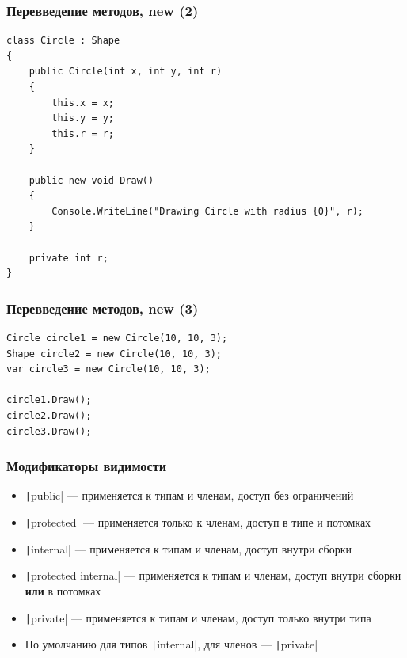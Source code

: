 \documentclass[xetex,mathserif,serif]{beamer}
\begin{document}
	\begin{frame}[fragile]
		\frametitle{Перевведение методов, new (2)}
		\begin{small}
			\begin{verbatim}
class Circle : Shape
{
    public Circle(int x, int y, int r)
    {
        this.x = x;
        this.y = y;
        this.r = r;
    }

    public new void Draw()
    {
        Console.WriteLine("Drawing Circle with radius {0}", r);
    }

    private int r;
}
			\end{verbatim}
		\end{small}
\end{frame}

	\begin{frame}[fragile]
		\frametitle{Перевведение методов, new (3)}
		\begin{verbatim}
Circle circle1 = new Circle(10, 10, 3);
Shape circle2 = new Circle(10, 10, 3);
var circle3 = new Circle(10, 10, 3);

circle1.Draw();
circle2.Draw();
circle3.Draw();
		\end{verbatim}
\end{frame}

	\begin{frame}
		\frametitle{Модификаторы видимости}
		\begin{itemize}
			\item \texttt|public| --- применяется к типам и членам, доступ без ограничений
			\item \texttt|protected| --- применяется только к членам, доступ в типе и потомках
			\item \texttt|internal| --- применяется к типам и членам, доступ внутри сборки
			\item \texttt|protected internal| --- применяется к типам и членам, доступ внутри сборки \textbf{или} в потомках
			\item \texttt|private| --- применяется к типам и членам, доступ только внутри типа
			\item По умолчанию для типов \texttt|internal|, для членов --- \texttt|private|
		\end{itemize}
	\end{frame}
\end{document}
